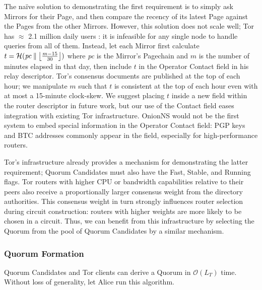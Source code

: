 \documentclass[conference]{IEEEtran}
\DeclarePairedDelimiter{\floor}{\lfloor}{\rfloor}
\newcommand*\concat{\mathbin{\|}}
\begin{document}
The na\"{i}ve solution to demonstrating the first requirement is to simply ask Mirrors for their Page, and then compare the recency of its latest Page against the Pages from the other Mirrors. However, this solution does not scale well; Tor has $ \approx $ 2.1 million daily users \cite{TorMetrics}: it is infeasible for any single node to handle queries from all of them. Instead, let each Mirror first calculate $ t = \mathcal{H}(\mathit{pc} \concat \floor[\big]{\frac{m - 15}{30}}) $ where \emph{pc} is the Mirror's Pagechain and $ m $ is the number of minutes elapsed in that day, then include $ t $ in the Operator Contact field in his relay descriptor. Tor's consensus documents are published at the top of each hour; we manipulate $ m $ such that $ t $ is consistent at the top of each hour even with at most a 15-minute clock-skew. We suggest placing $ t $ inside a new field within the router descriptor in future work, but our use of the Contact field eases integration with existing Tor infrastructure. OnionNS would not be the first system to embed special information in the Operator Contact field: PGP keys and BTC addresses commonly appear in the field, especially for high-performance routers.

Tor's infrastructure already provides a mechanism for demonstrating the latter requirement; Quorum Candidates must also have the Fast, Stable, and Running flags. Tor routers with higher CPU or bandwidth capabilities relative to their peers also receive a proportionally larger consensus weight from the directory authorities. This consensus weight in turn strongly influences router selection during circuit construction: routers with higher weights are more likely to be chosen in a circuit. Thus, we can benefit from this infrastructure by selecting the Quorum from the pool of Quorum Candidates by a similar mechanism.


\subsubsection{Quorum Formation}
\label{sec:qFormation}

Quorum Candidates and Tor clients can derive a Quorum in $ \mathcal{O}(L_{T}) $ time. Without loss of generality, let Alice run this algorithm.
\end{document}
